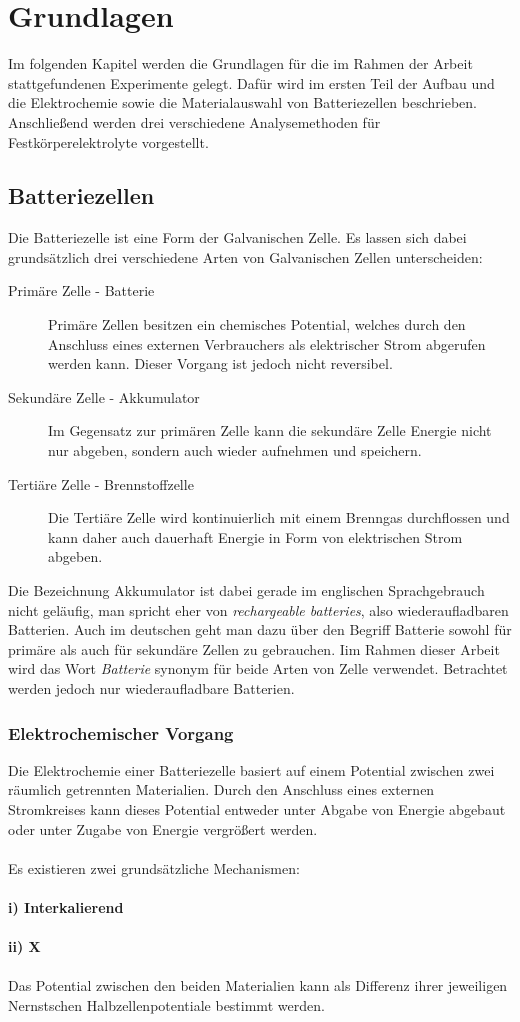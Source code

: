 \documentclass[a4paper, 11pt, headsepline,footsepline,twoside,abstract]{scrbook}
\begin{document}
\chapter{Grundlagen}
Im folgenden Kapitel werden die Grundlagen für die im Rahmen der Arbeit stattgefundenen Experimente gelegt. Dafür wird im ersten Teil der Aufbau und die Elektrochemie sowie die Materialauswahl von Batteriezellen beschrieben. Anschließend werden drei verschiedene Analysemethoden für Festkörperelektrolyte vorgestellt.
\section{Batteriezellen}
Die Batteriezelle ist eine Form der Galvanischen Zelle. Es lassen sich dabei grundsätzlich drei verschiedene Arten von Galvanischen Zellen unterscheiden:
\begin{description}
\item[Primäre Zelle - Batterie] Primäre Zellen besitzen ein chemisches Potential, welches durch den Anschluss eines externen Verbrauchers als elektrischer Strom abgerufen werden kann. Dieser Vorgang ist jedoch nicht reversibel.
\item[Sekundäre Zelle - Akkumulator] Im Gegensatz zur primären Zelle kann die sekundäre Zelle Energie nicht nur abgeben, sondern auch wieder aufnehmen und speichern.
\item[Tertiäre Zelle - Brennstoffzelle] Die Tertiäre Zelle wird kontinuierlich mit einem Brenngas durchflossen und kann daher auch dauerhaft Energie in Form von elektrischen Strom abgeben.  
\end{description}
Die Bezeichnung Akkumulator ist dabei gerade im englischen Sprachgebrauch nicht geläufig, man spricht eher von \textit{rechargeable batteries}, also wiederaufladbaren Batterien. Auch im deutschen geht man dazu über den Begriff Batterie sowohl für primäre als auch für sekundäre Zellen zu gebrauchen. Iim Rahmen dieser Arbeit wird das Wort \textit{Batterie} synonym für beide Arten von Zelle verwendet. Betrachtet werden jedoch nur wiederaufladbare Batterien.
\subsection{Elektrochemischer Vorgang}
Die Elektrochemie einer Batteriezelle basiert auf einem Potential zwischen zwei räumlich getrennten Materialien. Durch den Anschluss eines externen Stromkreises kann dieses Potential entweder unter Abgabe von Energie abgebaut oder unter Zugabe von Energie vergrößert werden. 
\\\\
Es existieren zwei grundsätzliche Mechanismen:
\\\\
\textbf{i) Interkalierend}
\\\\
\textbf{ii) X}
\\\\
Das Potential zwischen den beiden Materialien kann als Differenz ihrer jeweiligen Nernstschen Halbzellenpotentiale bestimmt werden.
\end{document}
